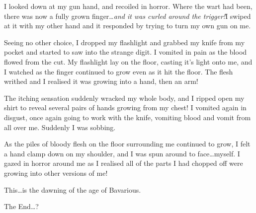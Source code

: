 I looked down at my gun hand, and recoiled in horror. Where the
wart had been, there was now a fully grown finger{\ldots}{\em and it was
curled around the trigger!}I swiped at it with my other hand and
it responded by trying to turn my own gun on me.



Seeing no other choice, I dropped my flashlight and grabbed my
knife from my pocket and started to saw into the strange digit. I
vomited in pain as the blood flowed from the cut. My flashlight lay
on the floor, casting it's light onto me, and I watched as the
finger continued to grow even as it hit the floor. The flesh
writhed and I realised it was growing into a hand, then an
arm!



The itching sensation suddenly wracked my whole body, and I ripped
open my shirt to reveal several pairs of hands growing from my
chest! I vomited again in disgust, once again going to work with
the knife, vomiting blood and vomit from all over me. Suddenly I
was sobbing.



As the piles of bloody flesh on the floor surrounding me continued
to grow, I felt a hand clamp down on my shoulder, and I was spun
around to face{\ldots}myself. I gazed in horror around me as I realised
all of the parts I had chopped off were growing into other versions
of me!



This{\ldots}is the dawning of the age of Bavarious.



The End{\ldots}? 
 






